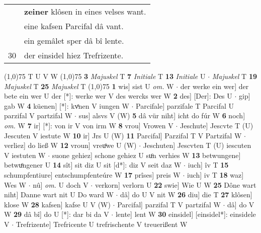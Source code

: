 \documentclass[8pt,a4paper,notitlepage]{article}
\begin{document}
\begin{table}[ht]
\begin{minipage}[t]{0.5\linewidth}
\begin{tabular}{rl}
 & \textbf{zeiner} klôsen in eines velses want.\\ 
 & eine kafsen Parcifal dâ vant.\\ 
 & ein gemâlet sper dâ bî lente.\\ 
30 & der einsidel hiez Trefrizente.\\ 
\end{tabular}
\scriptsize
\line(1,0){75} \newline
T U V W \newline
\line(1,0){75} \newline
\textbf{3} \textit{Majuskel} T  \textbf{7} \textit{Initiale} T  \textbf{13} \textit{Initiale} U   $\cdot$ \textit{Majuskel} T  \textbf{19} \textit{Majuskel} T  \textbf{25} \textit{Majuskel} T  \newline
\line(1,0){75} \newline
\textbf{1} wis] sist U \textit{om.} W  $\cdot$ der werke ein wer] der bete ein wer U der [*]: werke wer V des wercks wer W \textbf{2} des] [Der]: Des U  $\cdot$ gip] gab W \textbf{4} küenen] [*]: kvͤnen V iungen W  $\cdot$ Parcifale] parzifale T Parcifal U parzifal V partzifal W  $\cdot$ sus] alsvs V (W) \textbf{5} dâ vür niht] icht do fúr W \textbf{6} noch] \textit{om.} W \textbf{7} ir] [*]: von ir V von irm W \textbf{8} vrou] Vrowen V  $\cdot$ Jeschute] Jescvte T (U) Jescuten V iestute W \textbf{10} ir] Jrs U (W) \textbf{11} Parcifal] Parzifal T V Partzifal W  $\cdot$ verliez] do ließ W \textbf{12} vroun] vreuͦwe U (W)  $\cdot$ Jeschuten] Jescvten T (U) iescuten V iestuten W  $\cdot$ suone gehiez] schone gehiez U suͦn verhies W \textbf{13} betwungene] betwuͦngener U \textbf{14} sît] sit diz U sit [d*]: diz V seit daz W  $\cdot$ iuch] îv T \textbf{15} schumpfentiure] entschumpfenteúre W \textbf{17} prîses] preis W  $\cdot$ iuch] iv T \textbf{18} waz] Wes W  $\cdot$ nû] \textit{om.} U doch V  $\cdot$ verkorn] verlorn U \textbf{22} swie] Wie U W \textbf{25} Dône wart niht] Danne wart nit U Do ward W  $\cdot$ dâ] do U V nit W \textbf{26} diu] die T \textbf{27} klôsen] klose W \textbf{28} kafsen] kafse U V (W)  $\cdot$ Parcifal] parzifal T V partzifal W  $\cdot$ dâ] do V W \textbf{29} dâ bî] do U [*]: dar bi da V  $\cdot$ lente] lent W \textbf{30} einsidel] [einsidel*]: einsidele V  $\cdot$ Trefrizente] Trefricente U trefrischente V treuerißent W \newline
\end{minipage}
\end{table}
\end{document}
